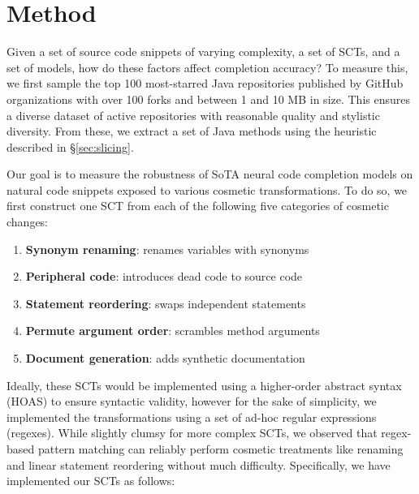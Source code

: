 \documentclass[sigconf,review,anonymous]{acmart}
\begin{document}
  \pagebreak\section{Method}

  Given a set of source code snippets of varying complexity, a set of SCTs, and a set of models, how do these factors affect completion accuracy? To measure this, we first sample the top 100 most-starred Java repositories published by GitHub organizations with over 100 forks and between 1 and 10 MB in size. This ensures a diverse dataset of active repositories with reasonable quality and stylistic diversity. From these, we extract a set of Java methods using the heuristic described in \S\ref{sec:slicing}.

  Our goal is to measure the robustness of SoTA neural code completion models on natural code snippets exposed to various cosmetic transformations. To do so, we first construct one SCT from each of the following five categories of cosmetic changes:

  \begin{enumerate}
    \item \textbf{Synonym renaming}: renames variables with synonyms
    \item \textbf{Peripheral code}: introduces dead code to source code
    \item \textbf{Statement reordering}: swaps independent statements
    \item \textbf{Permute argument order}: scrambles method arguments
    \item \textbf{Document generation}: adds synthetic documentation
  \end{enumerate}

  Ideally, these SCTs would be implemented using a higher-order abstract syntax (HOAS) to ensure syntactic validity, however for the sake of simplicity, we implemented the transformations using a set of ad-hoc regular expressions (regexes). While slightly clumsy for more complex SCTs, we observed that regex-based pattern matching can reliably perform cosmetic treatments like renaming and linear statement reordering without much difficulty. Specifically, we have implemented our SCTs as follows:
\end{document}
